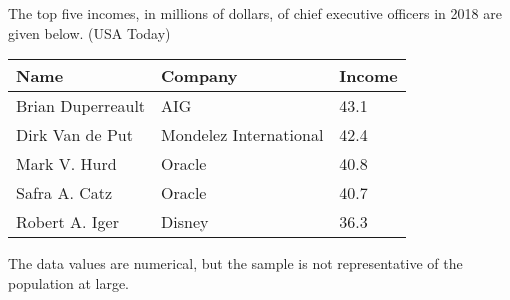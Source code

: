 \documentclass{beamer}
\begin{document}
\begin{frame}
\begin{example}
The top five incomes, in millions of dollars, of chief executive officers in 2018 are given below. (USA Today)
\begin{center}
\begin{tabular}{|l|l|l|}\hline
\textbf{Name} & \textbf{Company} & \textbf{Income} \\\hline
Brian Duperreault & AIG & 43.1 \\
Dirk Van de Put & Mondelez International & 42.4 \\
Mark V. Hurd & Oracle & 40.8 \\
Safra A. Catz & Oracle & 40.7 \\
Robert A. Iger & Disney & 36.3 \\\hline
\end{tabular}
\end{center}\pause

The data values are numerical, but the sample is not representative of the population at large.
\end{example}
\end{frame}
\end{document}
